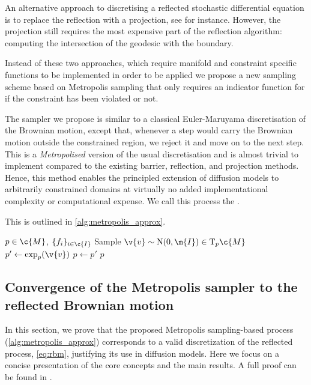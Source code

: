 An alternative approach to discretising a reflected stochastic differential equation is to replace the reflection with a projection, see \cite{slominski1994approximation} for instance.
However, the projection still requires the most expensive part of the reflection algorithm: computing the intersection of the geodesic with the boundary.

Instead of these two approaches, which require manifold and constraint specific functions to be implemented in order to be applied we propose a new sampling scheme based on Metropolis sampling that only requires an indicator function for if the constraint has been violated or not.

The sampler we propose is similar to a classical Euler-Maruyama discretisation of the Brownian motion, except that, whenever a step would carry the Brownian motion outside the constrained region, we reject it and move on to the next step.
This is a \emph{Metropolised} version of the usual discretisation and is almost trivial to implement compared to the existing barrier, reflection, and projection methods.
Hence, this method enables the principled extension of diffusion models to arbitrarily constrained domains at virtually {no added implementational complexity or computational expense}.
We call this process the .

This is outlined in \cref{alg:metropolis_approx}.
\begin{algorithm}[H]
	\caption{Metropolis approximation of reflected Brownian motion}
	\label{alg:metropolis_approx}
	\begin{algorithmic}
		\Require \(p \in \c{M}\), \(\{f_i\}_{i \in \c{I}}\)
		\State Sample \(\v{v} \sim \mathrm{N}(0,\m{I}) \in \mathrm{T}_p\c{M}\)
		\State \(p' \gets \exp_{p}(\v{v})\)
		\State \(p\gets p'\)
		\EndIf
		\Return \(p\)
	\end{algorithmic}
\end{algorithm}

\subsection{Convergence of the Metropolis sampler to the reflected Brownian motion}
\label{sec:theoretical_convergence}

In this section, we prove that the proposed Metropolis sampling-based process (\cref{alg:metropolis_approx}) corresponds to a valid discretization of the reflected process, \cref{eq:rbm}, justifying its use in diffusion models.
Here we focus on a concise presentation of the core concepts and the main results.
A full proof can be found in .

